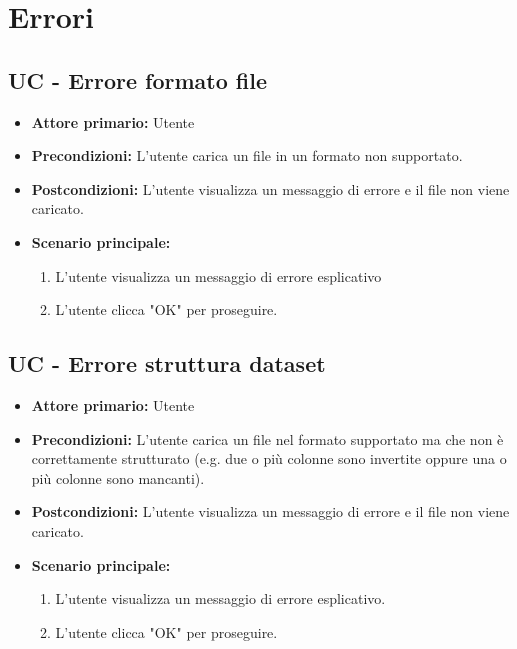 \newpage

\section{Errori}
\subsection{UC - Errore formato file}
\label{sec:UC - Errore formato file}
\begin{itemize}
    \item \textbf{Attore primario:} Utente
    \item \textbf{Precondizioni:} L'utente carica un file in un formato non supportato.
    \item \textbf{Postcondizioni:} L'utente visualizza un messaggio di errore e il file non viene caricato.
    \item \textbf{Scenario principale:}
          \begin{enumerate}
              \item L'utente visualizza un messaggio di errore esplicativo
              \item L'utente clicca "OK" per proseguire.
          \end{enumerate}
\end{itemize}

\subsection{UC - Errore struttura dataset}
\label{sec:UC - Errore struttura dataset}
\begin{itemize}
    \item \textbf{Attore primario:} Utente
    \item \textbf{Precondizioni:} L'utente carica un file nel formato supportato ma che non è correttamente strutturato  
                                  (e.g. due o più colonne sono invertite oppure una o più colonne sono mancanti). 
    \item \textbf{Postcondizioni:} L'utente visualizza un messaggio di errore e il file non viene caricato.
    \item \textbf{Scenario principale:}
          \begin{enumerate}
              \item L'utente visualizza un messaggio di errore esplicativo.
              \item L'utente clicca "OK" per proseguire.
          \end{enumerate} 
\end{itemize}


